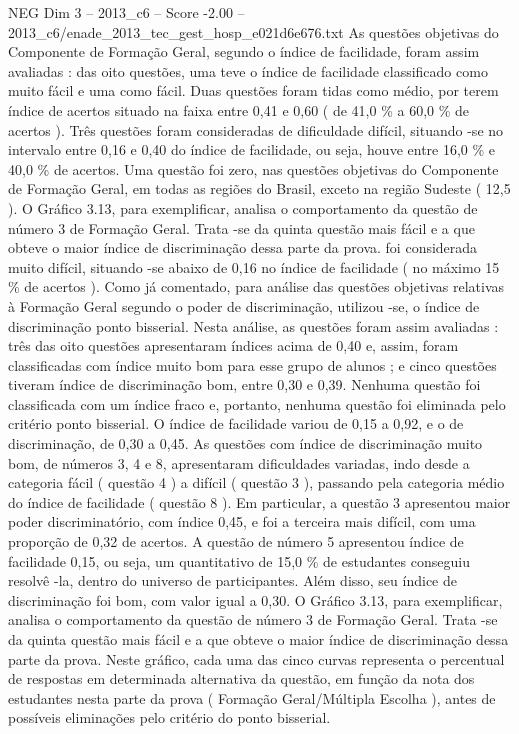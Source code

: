 \begin{textsample}{NEG Dim 3 – 2013\_c6 – Score -2.00 – 2013\_c6/enade\_2013\_tec\_gest\_hosp\_e021d6e676.txt}
As questões objetivas do Componente de Formação Geral, segundo o índice de facilidade, foram assim avaliadas : das oito questões, uma teve o índice de facilidade classificado como muito fácil e uma como fácil.
Duas questões foram tidas como médio, por terem índice de acertos situado na faixa entre 0,41 e 0,60 ( de 41,0 \% a 60,0 \% de acertos ).
Três questões foram consideradas de dificuldade difícil, situando -se no intervalo entre 0,16 e 0,40 do índice de facilidade, ou seja, houve entre 16,0 \% e 40,0 \% de acertos.
Uma questão foi zero, nas questões objetivas do Componente de Formação Geral, em todas as regiões do Brasil, exceto na região Sudeste ( 12,5 ).
O Gráfico 3.13, para exemplificar, analisa o comportamento da questão de número 3 de Formação Geral.
Trata -se da quinta questão mais fácil e a que obteve o maior índice de discriminação dessa parte da prova. foi considerada muito difícil, situando -se abaixo de 0,16 no índice de facilidade ( no máximo 15 \% de acertos ).
Como já comentado, para análise das questões objetivas relativas à Formação Geral segundo o poder de discriminação, utilizou -se, o índice de discriminação ponto bisserial.
Nesta análise, as questões foram assim avaliadas : três das oito questões apresentaram índices acima de 0,40 e, assim, foram classificadas com índice muito bom para esse grupo de alunos ; e cinco questões tiveram índice de discriminação bom, entre 0,30 e 0,39.
Nenhuma questão foi classificada com um índice fraco e, portanto, nenhuma questão foi eliminada pelo critério ponto bisserial.
O índice de facilidade variou de 0,15 a 0,92, e o de discriminação, de 0,30 a 0,45.
As questões com índice de discriminação muito bom, de números 3, 4 e 8, apresentaram dificuldades variadas, indo desde a categoria fácil ( questão 4 ) a difícil ( questão 3 ), passando pela categoria médio do índice de facilidade ( questão 8 ).
Em particular, a questão 3 apresentou maior poder discriminatório, com índice 0,45, e foi a terceira mais difícil, com uma proporção de 0,32 de acertos.
A questão de número 5 apresentou índice de facilidade 0,15, ou seja, um quantitativo de 15,0 \% de estudantes conseguiu resolvê -la, dentro do universo de participantes.
Além disso, seu índice de discriminação foi bom, com valor igual a 0,30.
O Gráfico 3.13, para exemplificar, analisa o comportamento da questão de número 3 de Formação Geral.
Trata -se da quinta questão mais fácil e a que obteve o maior índice de discriminação dessa parte da prova.
Neste gráfico, cada uma das cinco curvas representa o percentual de respostas em determinada alternativa da questão, em função da nota dos estudantes nesta parte da prova ( Formação Geral/Múltipla Escolha ), antes de possíveis eliminações pelo critério do ponto bisserial.

\end{textsample}
